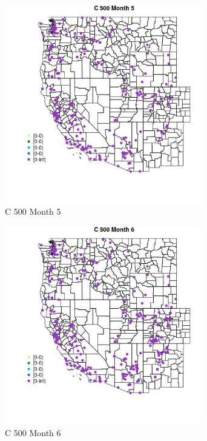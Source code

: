 \begin{figure} 
\centering  
\includegraphics[width=0.77\textwidth]{Code_Outputs/Report_ML_input_PM25_Step4_part_e_de_duplicated_aveswNAs_MapObsMo5C_500.jpg} 
\caption{\label{fig:Report_ML_input_PM25_Step4_part_e_de_duplicated_aveswNAsMapObsMo5C_500}C 500 Month 5} 
\end{figure} 
 

\begin{figure} 
\centering  
\includegraphics[width=0.77\textwidth]{Code_Outputs/Report_ML_input_PM25_Step4_part_e_de_duplicated_aveswNAs_MapObsMo6C_500.jpg} 
\caption{\label{fig:Report_ML_input_PM25_Step4_part_e_de_duplicated_aveswNAsMapObsMo6C_500}C 500 Month 6} 
\end{figure} 
 

